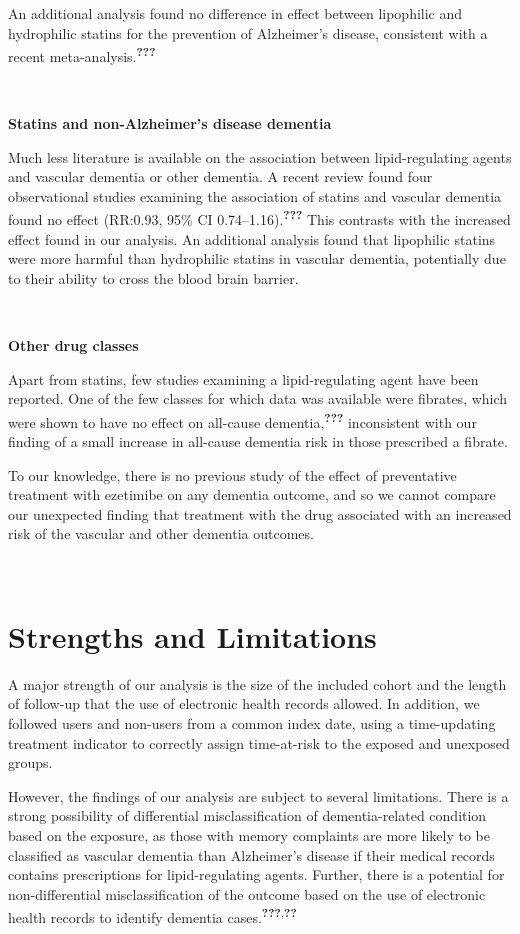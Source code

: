\documentclass[a4paper, twoside]{templates/ociamthesis}
\begin{document}
An additional analysis found no difference in effect between lipophilic and hydrophilic statins for the prevention of Alzheimer's disease, consistent with a recent meta-analysis.\textsuperscript{{\textbf{???}}}

~

\textbf{Statins and non-Alzheimer's disease dementia}

Much less literature is available on the association between lipid-regulating agents and vascular dementia or other dementia. A recent review found four observational studies examining the association of statins and vascular dementia found no effect (RR:0.93, 95\% CI 0.74--1.16).\textsuperscript{{\textbf{???}}} This contrasts with the increased effect found in our analysis. An additional analysis found that lipophilic statins were more harmful than hydrophilic statins in vascular dementia, potentially due to their ability to cross the blood brain barrier.

~

\textbf{Other drug classes}

Apart from statins, few studies examining a lipid-regulating agent have been reported. One of the few classes for which data was available were fibrates, which were shown to have no effect on all-cause dementia,\textsuperscript{{\textbf{???}}} inconsistent with our finding of a small increase in all-cause dementia risk in those prescribed a fibrate.

To our knowledge, there is no previous study of the effect of preventative treatment with ezetimibe on any dementia outcome, and so we cannot compare our unexpected finding that treatment with the drug associated with an increased risk of the vascular and other dementia outcomes.

~

\hypertarget{strengths-and-limitations}{%
\section{Strengths and Limitations}\label{strengths-and-limitations}}

A major strength of our analysis is the size of the included cohort and the length of follow-up that the use of electronic health records allowed. In addition, we followed users and non-users from a common index date, using a time-updating treatment indicator to correctly assign time-at-risk to the exposed and unexposed groups.

However, the findings of our analysis are subject to several limitations. There is a strong possibility of differential misclassification of dementia-related condition based on the exposure, as those with memory complaints are more likely to be classified as vascular dementia than Alzheimer's disease if their medical records contains prescriptions for lipid-regulating agents. Further, there is a potential for non-differential misclassification of the outcome based on the use of electronic health records to identify dementia cases.\textsuperscript{{\textbf{???}},{\textbf{??}}}
\end{document}
